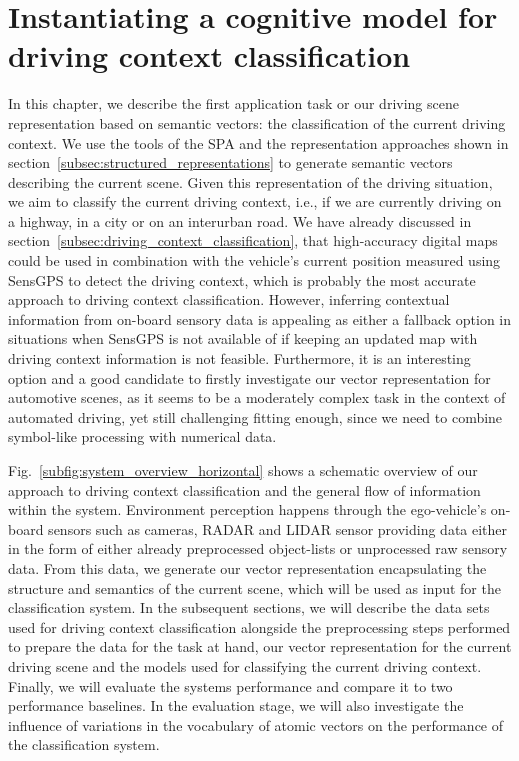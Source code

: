 \chapter{Instantiating a cognitive model for driving context classification}
\label{chap:driving_context_classification}

In this chapter, we describe the first application task or our driving scene representation based on semantic vectors: the classification of the current driving context.
We use the tools of the \ac{SPA} and the representation approaches shown in section~\ref{subsec:structured_representations} to generate semantic vectors describing the current scene.
Given this representation of the driving situation, we aim to classify the current driving context, i.e., if we are currently driving on a highway, in a city or on an interurban road.
We have already discussed in section~\ref{subsec:driving_context_classification}, that high-accuracy digital maps could be used in combination with the vehicle's current position measured using \ac{SensGPS} to detect the driving context, which is probably the most accurate approach to driving context classification.
However, inferring contextual information from on-board sensory data is appealing as either a fallback option in situations when \ac{SensGPS} is not available of if keeping an updated map with driving context information is not feasible.
Furthermore, it is an interesting option and a good candidate to firstly investigate our vector representation for automotive scenes, as it seems to be a moderately complex task in the context of automated driving, yet still challenging fitting enough, since we need to combine symbol-like processing with numerical data.

Fig.~\ref{subfig:system_overview_horizontal} shows a schematic overview of our approach to driving context classification  and the general flow of information within the system.
Environment perception happens through the ego-vehicle's on-board sensors such as cameras, \ac{RADAR} and \ac{LIDAR} sensor providing data either in the form of either already preprocessed object-lists or unprocessed raw sensory data.
From this data, we generate our vector representation encapsulating the structure and semantics of the current scene, which will be used as input for the classification system.
In the subsequent sections, we will describe the data sets used for driving context classification alongside the preprocessing steps performed to prepare the data for the task at hand, our vector representation for the current driving scene and the models used for classifying the current driving context.
Finally, we will evaluate the systems performance and compare it to two performance baselines.
In the evaluation stage, we will also investigate the influence of variations in the vocabulary of atomic vectors on the performance of the classification system.

